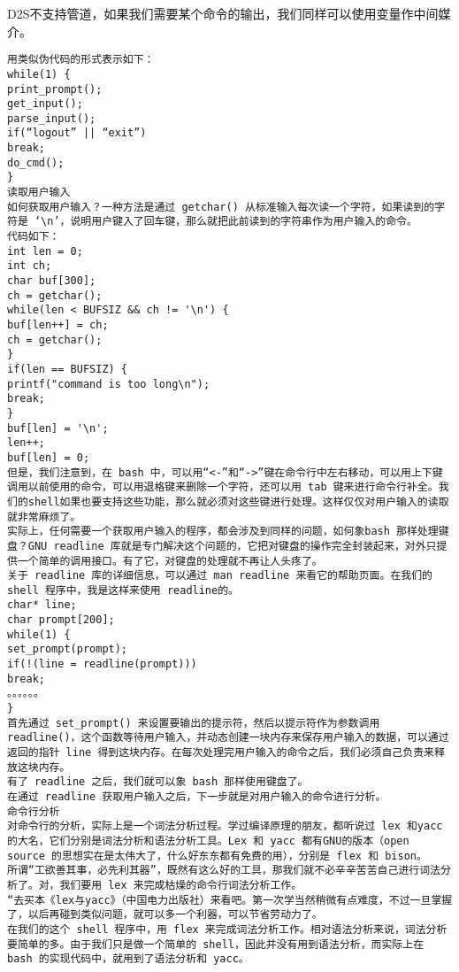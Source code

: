D2S不支持管道，如果我们需要某个命令的输出，我们同样可以使用变量作中间媒介。



\begin{lstlisting}
用类似伪代码的形式表示如下： 
while(1) { 
print_prompt(); 
get_input(); 
parse_input(); 
if(“logout” || “exit”) 
break; 
do_cmd(); 
} 
读取用户输入 
如何获取用户输入？一种方法是通过 getchar() 从标准输入每次读一个字符，如果读到的字符是 ‘\n’，说明用户键入了回车键，那么就把此前读到的字符串作为用户输入的命令。 
代码如下： 
int len = 0; 
int ch; 
char buf[300]; 
ch = getchar(); 
while(len < BUFSIZ && ch != '\n') { 
buf[len++] = ch; 
ch = getchar(); 
} 
if(len == BUFSIZ) { 
printf("command is too long\n"); 
break; 
} 
buf[len] = '\n'; 
len++; 
buf[len] = 0; 
但是，我们注意到，在 bash 中，可以用“<-”和“->”键在命令行中左右移动，可以用上下键调用以前使用的命令，可以用退格键来删除一个字符，还可以用 tab 键来进行命令行补全。我们的shell如果也要支持这些功能，那么就必须对这些键进行处理。这样仅仅对用户输入的读取就非常麻烦了。 
实际上，任何需要一个获取用户输入的程序，都会涉及到同样的问题，如何象bash 那样处理键盘？GNU readline 库就是专门解决这个问题的，它把对键盘的操作完全封装起来，对外只提供一个简单的调用接口。有了它，对键盘的处理就不再让人头疼了。 
关于 readline 库的详细信息，可以通过 man readline 来看它的帮助页面。在我们的 shell 程序中，我是这样来使用 readline的。 
char* line; 
char prompt[200]; 
while(1) { 
set_prompt(prompt); 
if(!(line = readline(prompt))) 
break; 
。。。。。。 
} 
首先通过 set_prompt() 来设置要输出的提示符，然后以提示符作为参数调用 readline()，这个函数等待用户输入，并动态创建一块内存来保存用户输入的数据，可以通过返回的指针 line 得到这块内存。在每次处理完用户输入的命令之后，我们必须自己负责来释放这块内存。 
有了 readline 之后，我们就可以象 bash 那样使用键盘了。 
在通过 readline 获取用户输入之后，下一步就是对用户输入的命令进行分析。 
命令行分析 
对命令行的分析，实际上是一个词法分析过程。学过编译原理的朋友，都听说过 lex 和yacc 的大名，它们分别是词法分析和语法分析工具。Lex 和 yacc 都有GNU的版本（open source 的思想实在是太伟大了，什么好东东都有免费的用），分别是 flex 和 bison。 
所谓“工欲善其事，必先利其器”，既然有这么好的工具，那我们就不必辛辛苦苦自己进行词法分析了。对，我们要用 lex 来完成枯燥的命令行词法分析工作。 
“去买本《lex与yacc》（中国电力出版社）来看吧。第一次学当然稍微有点难度，不过一旦掌握了，以后再碰到类似问题，就可以多一个利器，可以节省劳动力了。 
在我们的这个 shell 程序中，用 flex 来完成词法分析工作。相对语法分析来说，词法分析要简单的多。由于我们只是做一个简单的 shell，因此并没有用到语法分析，而实际上在 bash 的实现代码中，就用到了语法分析和 yacc。 

\end{lstlisting}
